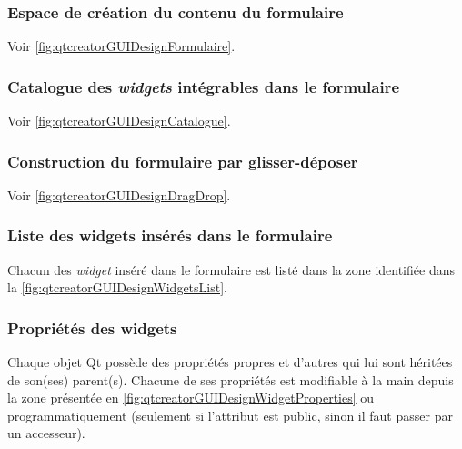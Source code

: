 \documentclass[12pt,a4paper,oneside,titlepage,final]{article}
\begin{document}

\subsubsection{Espace de création du contenu du formulaire}
\label{sec:concevoirGUIformulaire}
Voir \figurename \vref{fig:qtcreatorGUIDesignFormulaire}.


\subsubsection{Catalogue des \emph{widgets} intégrables dans le
  formulaire}
\label{sec:concevoirGUIwidgetsCatalogue}
Voir \figurename \vref{fig:qtcreatorGUIDesignCatalogue}.


\subsubsection{Construction du formulaire par glisser-déposer}
\label{sec:concevoirGUIDragDrop}
Voir \figurename \vref{fig:qtcreatorGUIDesignDragDrop}.


\subsubsection{Liste des widgets insérés dans le formulaire}
\label{sec:concevoirGUIwidgetsList}
Chacun des \emph{widget} inséré dans le formulaire est listé dans la
zone identifiée dans la \figurename
\vref{fig:qtcreatorGUIDesignWidgetsList}.


\subsubsection{Propriétés des widgets}
\label{sec:concevoirGUIwidgetProperties}
Chaque objet \gls{Qt} possède des propriétés propres et d'autres qui
lui sont héritées de son(ses) parent(s). Chacune de ses propriétés est
modifiable à la main depuis la zone présentée en \figurename
\vref{fig:qtcreatorGUIDesignWidgetProperties} ou programmatiquement
(seulement si l'attribut est public, sinon il faut passer par un
accesseur).
\end{document}
